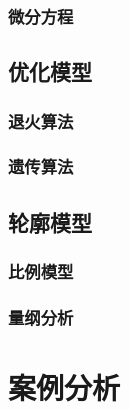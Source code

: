\subsection{微分方程}
\clearpage
\section{优化模型}
\subsection{退火算法}
\clearpage
\subsection{遗传算法}
\clearpage
\section{轮廓模型}
\subsection{比例模型}
\clearpage
\subsection{量纲分析}
\clearpage
\chapter{案例分析}